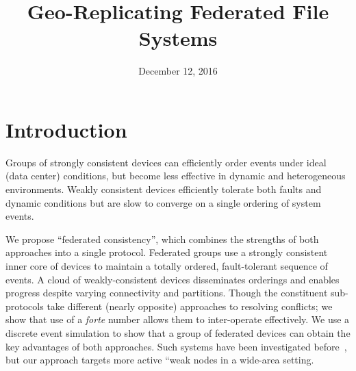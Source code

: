 \documentclass[10pt,conference,letterpaper]{IEEEtran}
\newcommand{\dspace}{\renewcommand{\baselinestretch}{1.04805}\Large\normalsize}
\begin{document}
\dspace

\title{Geo-Replicating Federated File Systems}
\author{
}

%

\date{December 12, 2016}

\maketitle

\IEEEdisplaynotcompsoctitleabstractindextext

\section{Introduction}

Groups of strongly consistent devices can efficiently order events under
ideal (data center) conditions, but become less effective in dynamic and
heterogeneous environments.  Weakly consistent devices efficiently
tolerate both faults and dynamic conditions but are slow to converge on a
single ordering of system events.

We propose ``federated consistency'', which combines the strengths of both approaches into
a single protocol.
Federated groups use a strongly consistent inner core of devices to maintain a totally
ordered, fault-tolerant sequence of events.  A cloud of weakly-consistent devices
disseminates orderings and enables progress despite varying connectivity and partitions.
Though the constituent sub-protocols take different (nearly opposite) approaches to
resolving conflicts; we show that use of a \emph{forte} number allows them to inter-operate
effectively.  We use a discrete event simulation to show that a group of federated devices
can obtain the key advantages of both approaches.
Such systems have been investigated
before~\cite{gray_dangers_1996,kubiatowicz_oceanstore:_2000}, but our approach targets
more active ``weak nodes in a wide-area setting.
\end{document}
